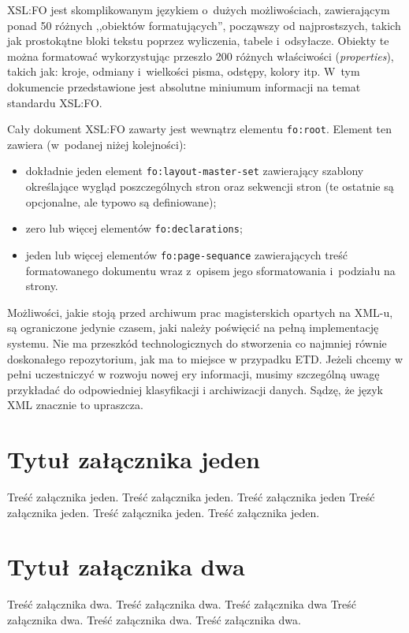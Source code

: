 \documentclass[skorowidz,palatino,brudnopis,xodstep]{wimgr}
\begin{document}
XSL:FO jest skomplikowanym językiem o~dużych możliwościach,
zawierającym ponad 50 różnych ,,obiektów formatujących'', począwszy od
najprostszych, takich jak prostokątne bloki tekstu poprzez wyliczenia,
tabele i~odsyłacze. Obiekty te można formatować wykorzystując przeszło
200 różnych właściwości (\emph{properties\/}), takich jak: kroje,
odmiany i~wielkości pisma, odstępy, kolory itp.  
W~tym dokumencie przedstawione jest absolutne miniumum informacji 
na temat standardu XSL:FO.

Cały dokument XSL:FO zawarty jest wewnątrz elementu \texttt{fo:root}.
Element ten zawiera (w~podanej niżej kolejności):
\begin{itemize}
\item dokładnie jeden element \texttt{fo:layout-master-set} zawierający
  szablony określające wygląd poszczególnych stron oraz sekwencji
  stron (te ostatnie są opcjonalne, ale typowo są definiowane);
\item zero lub więcej elementów \texttt{fo:declarations};
\item jeden lub więcej elementów \texttt{fo:page-sequance}
 zawierających treść formatowanego dokumentu wraz z~opisem
 jego sformatowania i~podziału na strony.
\end{itemize}

%
\summary
Możliwości, jakie stoją przed archiwum prac magisterskich opartych na
XML-u, są ograniczone jedynie czasem, jaki należy poświęcić na pełną
implementację systemu. Nie ma przeszkód technologicznych do stworzenia
co najmniej równie doskonałego repozytorium, jak ma to miejsce w
przypadku ETD. Jeżeli chcemy w pełni uczestniczyć w rozwoju nowej ery
informacji, musimy szczególną uwagę przykładać do odpowiedniej
klasyfikacji i archiwizacji danych. Sądzę, że język XML znacznie to
upraszcza.

%
\appendix
\chapter{Tytuł załącznika jeden}

Treść załącznika jeden. Treść załącznika jeden. Treść załącznika jeden
Treść załącznika jeden. Treść załącznika jeden.
Treść załącznika jeden.

\chapter{Tytuł załącznika dwa}

Treść załącznika dwa. Treść załącznika dwa. Treść załącznika dwa
Treść załącznika dwa. Treść załącznika dwa.
Treść załącznika dwa.
\end{document}
